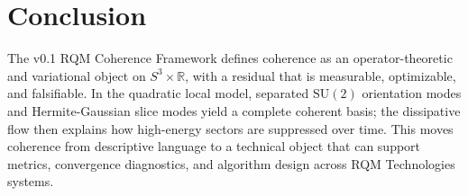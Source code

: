 \documentclass[11pt]{article}
\theoremstyle{remark}
\newcommand{\R}{\mathbb{R}}
\newcommand{\SU}{\mathrm{SU}}
\begin{document}
\section{Conclusion}

The v0.1 RQM Coherence Framework defines coherence as an operator-theoretic and variational object on $S^3\times\R$, with a residual that is measurable, optimizable, and falsifiable. In the quadratic local model, separated $\SU(2)$ orientation modes and Hermite-Gaussian slice modes yield a complete coherent basis; the dissipative flow then explains how high-energy sectors are suppressed over time. This moves coherence from descriptive language to a technical object that can support metrics, convergence diagnostics, and algorithm design across RQM Technologies systems.



\end{document}
